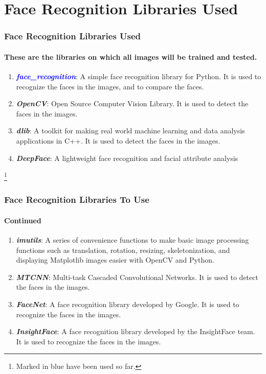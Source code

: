 \documentclass[aspectratio=169]{beamer}
\begin{document}
\section{Face Recognition Libraries Used}
\begin{frame}
	\centering
	\frametitle{Face Recognition Libraries Used}
	\framesubtitle{These are the libraries on which all images will be trained and tested. }
	\begin{minipage}{0.95\textwidth}
		\begin{enumerate}
			\item \textcolor{blue}{\textbf{\textit{face\_recognition}}}: A simple face recognition library for Python. It is used to recognize the faces in the images, and to compare the faces.
			\item \textbf{\textit{OpenCV}}: Open Source Computer Vision Library. It is used to detect the faces in the images.
			\item \textbf{\textit{dlib}}: A toolkit for making real world machine learning and data analysis applications in C++. It is used to detect the faces in the images.
			\item \textbf{\textit{DeepFace}}: A lightweight face recognition and facial attribute analysis
		\end{enumerate}
	\end{minipage}
	\footnote{Marked in blue have been used so far. }
\end{frame}
\begin{frame}
	\centering
	\frametitle{Face Recognition Libraries To Use}
	\framesubtitle{Continued}
	\begin{minipage}{0.95\textwidth}
		\begin{enumerate}
			\item \textbf{\textit{imutils}}: A series of convenience functions to make basic image processing functions such as translation, rotation, resizing, skeletonization, and displaying Matplotlib images easier with OpenCV and Python.
			\item \textbf{\textit{MTCNN}}: Multi-task Cascaded Convolutional Networks. It is used to detect the faces in the images.
			\item \textbf{\textit{FaceNet}}: A face recognition library developed by Google. It is used to recognize the faces in the images.
			\item \textbf{\textit{InsightFace}}: A face recognition library developed by the InsightFace team. It is used to recognize the faces in the images.
		\end{enumerate}
	\end{minipage}
\end{frame}
\end{document}
